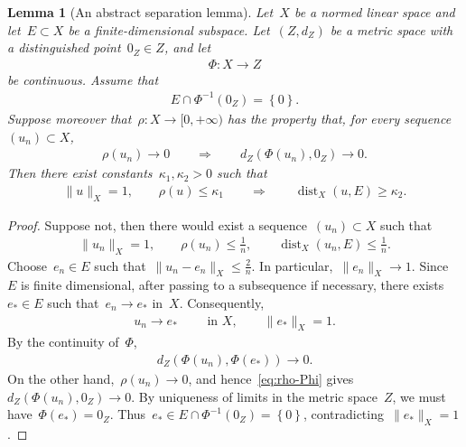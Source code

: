 \documentclass[11pt,final]{amsart}
\newcommand{\braces}[1]{\left\{#1\right\}} %
\DeclareMathOperator{\dist}{dist}
\newtheorem{lemma}[thm]{Lemma}
\begin{document}
\begin{lemma}[An abstract separation lemma]\label{lemma:abstract-separation}
    Let~$X$ be a normed linear space and let~$E\subset X$ be a finite-dimensional subspace.
    Let~$(Z,d_Z)$ be a metric space with a distinguished point~$0_Z\in Z$, and let
    \begin{align}
        \Phi\colon X\to Z
    \end{align}
    be continuous.
    Assume that
    \begin{align}\label{eq:trivial-intersection}
        E\cap \Phi^{-1}(0_Z)=\braces{0}.
    \end{align}
    Suppose moreover that~$\rho\colon X\to[0,+\infty)$ has the property that, for every sequence~$(u_n)\subset X$,
    \begin{align}\label{eq:rho-Phi}
        \rho(u_n)\to0
        \qquad\Longrightarrow\qquad
        d_Z(\Phi(u_n),0_Z)\to0.
    \end{align}
    Then there exist constants~$\kappa_1,\kappa_2>0$ such that
    \begin{align}\label{eq:abstract-separation}
        \|u\|_X=1,
        \qquad
        \rho(u)\leq\kappa_1
        \qquad\Longrightarrow\qquad
        \dist_X(u,E)\geq\kappa_2.
    \end{align}
\end{lemma}

\begin{proof}
    Suppose not, then there would exist a sequence~$(u_n)\subset X$ such that
    \begin{align}
        \|u_n\|_X=1,
        \qquad
        \rho(u_n)\leq\frac{1}{n},
        \qquad
        \dist_X(u_n,E)\leq\frac{1}{n}.
    \end{align}
    Choose~$e_n\in E$ such that~$\|u_n-e_n\|_X\leq \frac{2}{n}$. 
    In particular,~$\|e_n\|_X\to1$. 
    Since~$E$ is finite dimensional, after passing to a subsequence if necessary, there exists~$e_*\in E$ such that~$e_n\to e_*$ in~$X$. 
    Consequently,
    \begin{align}
        u_n\to e_*
        \qquad\mbox{ in }X,
        \qquad
        \|e_*\|_X=1.
    \end{align}
    By the continuity of~$\Phi$,
    \begin{align}
        d_Z(\Phi(u_n),\Phi(e_*))\to0.
    \end{align}
    On the other hand,~$\rho(u_n)\to0$, and hence~\eqref{eq:rho-Phi} gives~$ d_Z(\Phi(u_n),0_Z)\to0$. 
    By uniqueness of limits in the metric space~$Z$, we must have~$\Phi(e_*)=0_Z$. 
    Thus~$e_*\in E\cap\Phi^{-1}(0_Z)=\braces{0}$, contradicting~$\|e_*\|_X=1$.
\end{proof}
\end{document}
